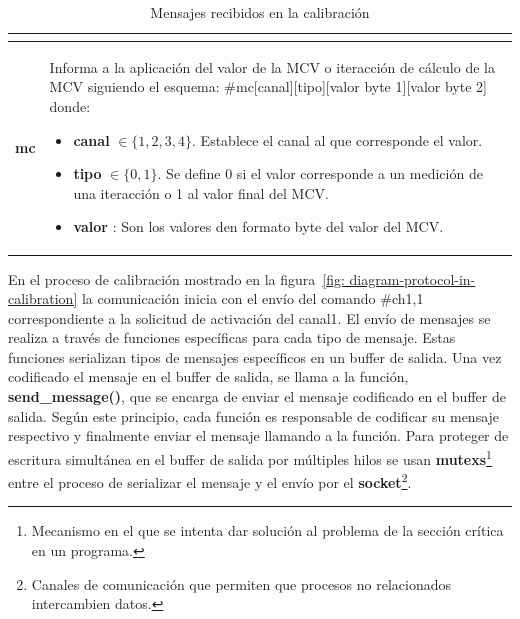 \begin{table}[ht]
\begin{tabular}{ |c|p{14cm}|}
\begin{minipage}{14cm}
\begin{itemize}
                                \end{itemize}
                                \vspace{1pt}
                            \end{minipage}\\\hline 
        \textbf{mc}     &   \begin{minipage}{14cm}
                                \vspace{1pt}
                                Informa a la aplicación del valor de la MCV o iteracción de cálculo de la MCV siguiendo el esquema: \#mc[canal][tipo][valor byte 1][valor byte 2] donde:
                                \begin{itemize}
                                    \item \textbf{canal} $\in \{ 1, 2, 3, 4\}$. Establece el canal al que corresponde el valor.
                                    \item \textbf{tipo} $\in \{ 0, 1\}$. Se define 0 si el valor corresponde a un medición de una iteracción o 1 al valor final del MCV.
                                    \item \textbf{valor} : Son los valores den formato byte del valor del MCV.  
                                \end{itemize}
                                \vspace{1pt}
                            \end{minipage} \\\hline                        
    \end{tabular}
    \caption{Mensajes recibidos en la calibración}
    \label{table:recive-msg-in-calibration}
\end{table} 

\newpage
{}
En el proceso de calibración mostrado en la figura~\ref{fig: diagram-protocol-in-calibration}  la comunicación inicia con el envío del comando \#ch1,1 correspondiente a la solicitud de activación  del canal1. El envío de mensajes se realiza  a través de funciones específicas para cada tipo de mensaje. Estas funciones serializan tipos de mensajes específicos en un buffer de salida. Una vez codificado el mensaje en el buffer de salida, se llama a la función, \textbf{send\_message()}, que se encarga de enviar el mensaje codificado en el buffer de salida. Según este principio, cada función es responsable de codificar su mensaje respectivo y finalmente enviar el mensaje llamando a la función. Para proteger de escritura simultánea en el buffer de salida por múltiples hilos se usan \textbf{mutexs}\footnote{Mecanismo en el que se intenta dar solución al problema de la sección crítica en un programa.} entre el proceso de serializar el mensaje y el envío por el {\textbf{socket}}\footnote{Canales de comunicación que permiten que procesos no relacionados intercambien datos.}. 
    
